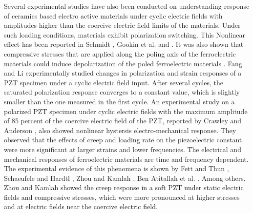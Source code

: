 Several experimental studies have also been conducted on understanding response of ceramics based electro active materials 
under cyclic electric fields with amplitudes higher than the coercive electric field limits of the materials. 
Under such loading conditions, materials exhibit polarization switching.
This Nonlinear effect has been reported in Schmidt \cite{schmidtcoercive1981}, Gookin et al. \cite{gookinelectro-optic1984} and \cite{raey}.  
It was also shown that compressive stresses that are applied along the poling axis of the ferroelectric materials could induce depolarization of the poled ferroelectric materials \cite{lynch1996effect, chena1998, raey}. 
Fang and Li \cite{raey} experimentally studied changes in polarization and strain responses of a PZT specimen under a cyclic electric field input. 
After several cycles, the saturated polarization response converges to a constant value, which is slightly smaller than the one measured in the first cycle. 
An experimental study on a polarized PZT specimen under cyclic electric fields with the maximum amplitude of 85 percent of the coercive electric field of the PZT, reported by Crawley and Anderson \cite{Crawley1990}, 
also showed nonlinear hystersis electro-mechanical response.  
They observed that the effects of creep and loading rate on the piezoelectric constant were more significant at larger strains and lower frequencies. 
The electrical and mechanical responses of ferroelectric materials are time and frequency dependent.
The experimental evidence of this phenomena is shown by Fett and Thun \cite{fettdetermination1998}, Schaeufele and Hardtl \cite{schaufele1996ferroelastic}, Zhou and Kamlah \cite{zhoudetermination2005,Zhou2006}, Ben Atitallah et al. \cite{ben2010temperature}.
Among others, Zhou and Kamlah \cite{zhoudetermination2005,Zhou2006} showed the creep response in a soft PZT under static electric fields and compressive stresses, which were more pronounced at higher stresses and at electric fields near the coercive electric field.

